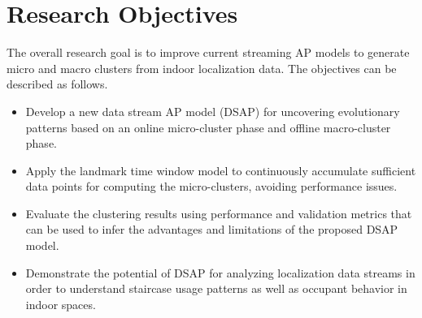 




\section{Research Objectives}

The overall research goal is to improve current streaming AP models to generate micro and macro clusters from indoor localization data. The objectives can be described as follows. 

\begin{itemize}

    \item Develop a new data stream AP model (DSAP) for uncovering evolutionary patterns based on an online micro-cluster phase and offline macro-cluster phase.
     \item Apply the landmark time window model to continuously accumulate sufficient data points for computing the micro-clusters, avoiding performance issues.
    \item Evaluate the clustering results using performance and validation metrics that can be used to infer the advantages and limitations of the proposed DSAP model.  
    \item Demonstrate the potential of DSAP for analyzing localization data streams in order to understand staircase usage patterns as well as occupant behavior in indoor spaces.
\end{itemize}  

